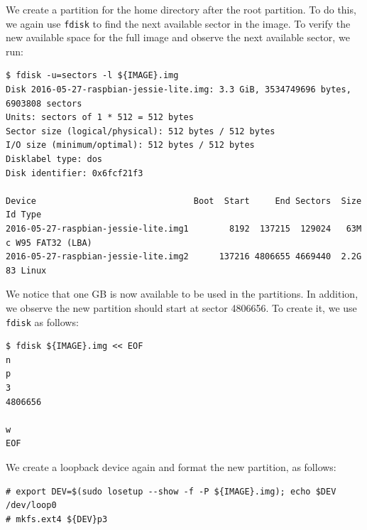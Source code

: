 \documentclass[electronics,article,accept,moreauthors,pdftex,10pt,a4paper]{mdpi}
\theoremstyle{mdpi}
\newcounter{ex}
\newcounter{re}
\theoremstyle{mdpidefinition}
\begin{document}
We create a partition for the home directory after the root partition.
To do this, we again use \texttt{fdisk} to find the next available sector
in the image. To verify the new available space for the full image and observe
the next available sector, we run:
\begin{lstlisting}[]
$ fdisk -u=sectors -l ${IMAGE}.img
Disk 2016-05-27-raspbian-jessie-lite.img: 3.3 GiB, 3534749696 bytes, 6903808 sectors
Units: sectors of 1 * 512 = 512 bytes
Sector size (logical/physical): 512 bytes / 512 bytes
I/O size (minimum/optimal): 512 bytes / 512 bytes
Disklabel type: dos
Disk identifier: 0x6fcf21f3

Device                               Boot  Start     End Sectors  Size Id Type
2016-05-27-raspbian-jessie-lite.img1        8192  137215  129024   63M  c W95 FAT32 (LBA)
2016-05-27-raspbian-jessie-lite.img2      137216 4806655 4669440  2.2G 83 Linux
\end{lstlisting}
\FloatBarrier
\vspace{-5mm}

We notice that one GB is now available to be used in the partitions. In addition, we
observe the new partition should start at sector 4806656. To create it, we
use \texttt{fdisk} as follows:%

%
%
%
\begin{lstlisting}[]
$ fdisk ${IMAGE}.img << EOF
n
p
3
4806656

w
EOF
\end{lstlisting}
\FloatBarrier
\vspace{-5mm}


We create a loopback device again and format the new partition, as follows:
\begin{lstlisting}[]
# export DEV=$(sudo losetup --show -f -P ${IMAGE}.img); echo $DEV
/dev/loop0
# mkfs.ext4 ${DEV}p3
\end{lstlisting}
\FloatBarrier
\vspace{-5mm}
\end{document}

